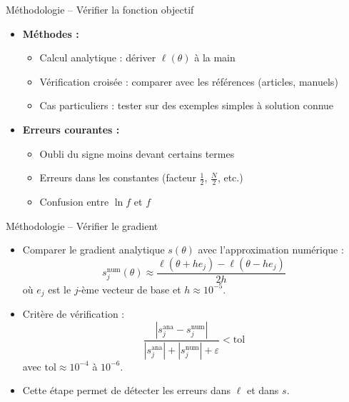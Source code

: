 \documentclass[11pt,aspectratio=169]{beamer}
\begin{document}
\begin{frame}{Méthodologie -- Vérifier la fonction objectif}

\begin{itemize}

\item \textbf{Méthodes :}
  \begin{itemize}
    \item Calcul analytique : dériver $\ell(\theta)$ à la main\newline
    \item Vérification croisée : comparer avec les références (articles, manuels)\newline
    \item Cas particuliers : tester sur des exemples simples à solution connue\newline
  \end{itemize}

\item \textbf{Erreurs courantes :}
  \begin{itemize}
    \item Oubli du signe moins devant certains termes\newline
    \item Erreurs dans les constantes (facteur $\frac{1}{2}$, $\frac{N}{2}$, etc.)\newline
    \item Confusion entre $\ln f$ et $f$
  \end{itemize}

\end{itemize}

\end{frame}

\begin{frame}{Méthodologie -- Vérifier le gradient}

\begin{itemize}

\item Comparer le gradient analytique $s(\theta)$ avec l'approximation numérique :
  \[
  s_j^{\text{num}}(\theta) \approx \frac{\ell(\theta + h e_j) - \ell(\theta - h e_j)}{2h}
  \]
  où $e_j$ est le $j$-ème vecteur de base et $h \approx 10^{-5}$.\newline

\item Critère de vérification :
  \[
  \frac{|s_j^{\text{ana}} - s_j^{\text{num}}|}{|s_j^{\text{ana}}| + |s_j^{\text{num}}| + \varepsilon} < \text{tol}
  \]
  avec $\text{tol} \approx 10^{-4}$ à $10^{-6}$.\newline

\item Cette étape permet de détecter les erreurs dans $\ell$ et dans $s$.

\end{itemize}

\end{frame}
\end{document}
